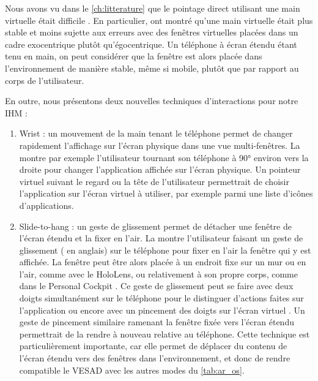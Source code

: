 Nous avons vu dans le \autoref{ch:litterature} que le pointage direct utilisant une main virtuelle était difficile \citep{Chan2010, Argelaguet2013}. En particulier, \cite{Ens2014} ont montré qu'une main virtuelle était plus stable et moins sujette aux erreurs avec des fenêtres virtuelles placées dans un cadre exocentrique plutôt qu'égocentrique. Un téléphone à écran étendu étant tenu en main, on peut considérer que la fenêtre est alors placée dans l'environnement de manière stable, même si mobile, plutôt que par rapport au corps de l'utilisateur.


En outre, nous présentons deux nouvelles techniques d'interactions pour notre IHM :
\begin{enumerate}
  \item Wrist : un mouvement de la main tenant le téléphone permet de changer rapidement l'affichage sur l'écran physique dans une vue multi-fenêtres. La  montre par exemple l'utilisateur tournant son téléphone à \ang{90} environ vers la droite pour changer l'application affichée sur l'écran physique. Un pointeur virtuel suivant le regard ou la tête de l'utilisateur permettrait de choisir l'application sur l'écran virtuel à utiliser, par exemple parmi une liste d'icônes d'applications.
  \item Slide-to-hang : un geste de glissement permet de détacher une fenêtre de l'écran étendu et la fixer en l'air. La  montre l'utilisateur faisant un geste de glissement ( en anglais) sur le téléphone pour fixer en l'air la fenêtre qui y est affichée. La fenêtre peut être alors placée à un endroit fixe sur un mur ou en l'air, comme avec le HoloLens, ou relativement à son propre corps, comme dans le Personal Cockpit \citep{Ens2014}. Ce geste de glissement peut se faire avec deux doigts simultanément sur le téléphone pour le distinguer d'actions faites sur l'application ou encore avec un pincement des doigts sur l'écran virtuel \citep{Piumsomboon2014}. Un geste de pincement similaire ramenant la fenêtre fixée vers l'écran étendu permettrait de la rendre à nouveau relative au téléphone. Cette technique est particulièrement importante, car elle permet de déplacer du contenu de l'écran étendu vers des fenêtres dans l'environnement, et donc de rendre compatible le VESAD avec les autres modes du \autoref{tab:ar_os}.
\end{enumerate}